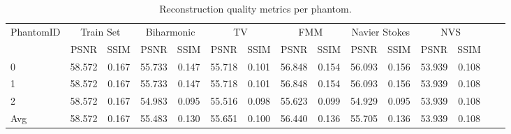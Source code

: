 \begin{table}
\caption{Reconstruction quality metrics per phantom.}
\label{tab:phantom_metrics}
\begin{tabular}{|lcc|cc|cc|cc|cc|cc|cc|}
\toprule
PhantomID & \multicolumn{2}{c}{Train Set} & \multicolumn{2}{c}{Biharmonic} & \multicolumn{2}{c}{TV} & \multicolumn{2}{c}{FMM} & \multicolumn{2}{c}{Navier Stokes} & \multicolumn{2}{c}{NVS} \\
 & PSNR & SSIM & PSNR & SSIM & PSNR & SSIM & PSNR & SSIM & PSNR & SSIM & PSNR & SSIM \\
\midrule
0 & 58.572 & 0.167 & 55.733 & 0.147 & 55.718 & 0.101 & 56.848 & 0.154 & 56.093 & 0.156 & 53.939 & 0.108 \\
1 & 58.572 & 0.167 & 55.733 & 0.147 & 55.718 & 0.101 & 56.848 & 0.154 & 56.093 & 0.156 & 53.939 & 0.108 \\
2 & 58.572 & 0.167 & 54.983 & 0.095 & 55.516 & 0.098 & 55.623 & 0.099 & 54.929 & 0.095 & 53.939 & 0.108 \\
Avg & 58.572 & 0.167 & 55.483 & 0.130 & 55.651 & 0.100 & 56.440 & 0.136 & 55.705 & 0.136 & 53.939 & 0.108 \\
\bottomrule
\end{tabular}
\end{table}
